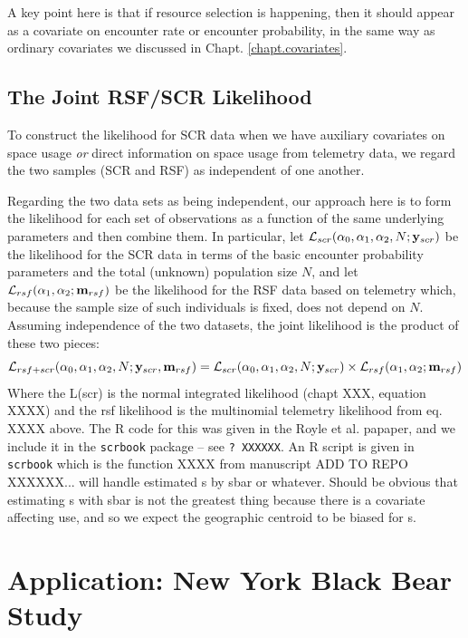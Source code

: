 A key point here is that if resource selection is happening, then it
should appear as a covariate on encounter rate or encounter
probability, in the same way as ordinary covariates we discussed in
Chapt. \ref{chapt.covariates}. 


\subsection{The Joint RSF/SCR Likelihood}

To construct the likelihood for SCR data when we have auxiliary
covariates on space usage {\it or} direct information on space usage
from telemetry data, we regard the two samples (SCR and RSF) as
independent of one another. 


Regarding the two data sets as being independent, our approach here
is to form the likelihood for each set of observations as a function
of the same underlying parameters and then combine them. In
particular, let ${\cal L}_{scr}(\alpha_{0}, \alpha_{1}, \alpha_{2}, N;{\bf y}_{scr})$
be the likelihood for the SCR data in terms of the basic encounter
probability parameters and the total (unknown) population size $N$,
and let ${\cal L}_{rsf}(\alpha_{1},\alpha_{2}; {\bf m}_{rsf})$ be the
likelihood for the RSF data based on telemetry which, because the
sample size of such individuals is fixed, does not depend on $N$.
Assuming independence of the two datasets, the
joint likelihood is the product of these two pieces:
\[
{\cal L}_{rsf+scr}(\alpha_{0},\alpha_{1},\alpha_{2},N; {\bf y}_{scr},{\bf
  m}_{rsf})  =
{\cal L}_{scr}(\alpha_{0}, \alpha_{1}, \alpha_{2}, N;{\bf y}_{scr})
\times 
{\cal L}_{rsf}(\alpha_{1},\alpha_{2}; {\bf m}_{rsf})
\]
Where the L(scr) is the normal integrated likelihood (chapt XXX,
equation XXXX) and the rsf likelihood is the multinomial telemetry
likelihood from eq. XXXX above. 
The R code for this was given in the Royle et al. papaper, and we
include it in the \mbox{\tt scrbook} package -- see \mbox{\tt ? XXXXXX}.
An R script is given in \mbox{\tt scrbook} which is the function XXXX
from manuscript ADD TO REPO XXXXXX... will handle estimated s by sbar
or whatever.   Should be obvious that estimating s with sbar is not
the greatest thing because there is a covariate affecting use, and so
we expect the geographic centroid to be biased for s.


\section{Application: New York Black Bear Study}
\label{rsf.chapt.nybears}

